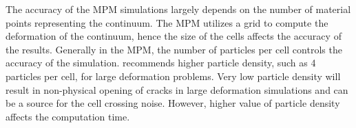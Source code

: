 The accuracy of the MPM simulations largely depends on the number of material 
points representing the continuum. The MPM utilizes a grid to compute the 
deformation of the continuum, hence the size of the cells affects the accuracy 
of the results. Generally in the MPM, the number of particles per cell controls 
the accuracy of the simulation. \citet{Guilkey2003} recommends higher particle 
density, such as 4 particles per cell, for large deformation problems. Very low 
particle density will result in non-physical opening of cracks in large 
deformation simulations and can be a source for the cell crossing noise. 
However, higher value of particle density affects the computation time. 
